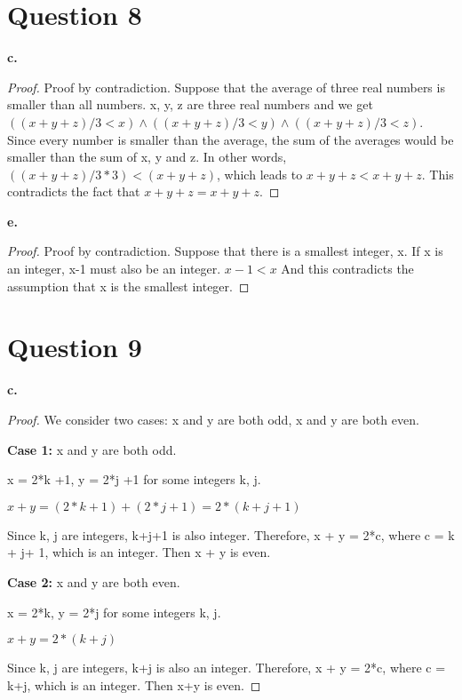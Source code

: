 \documentclass[11pt]{article}
\begin{document}
	\newpage
	\section*{Question 8}
	\textbf{c.}
	\begin{proof}
	Proof by contradiction. Suppose that the average of three real numbers is smaller than all numbers. x, y, z are three real numbers and we get $((x+y+z)/3<x)\wedge ((x+y+z)/3<y)\wedge ((x+y+z)/3<z)$. Since every number is smaller than the average, the sum of the averages would be smaller than the sum of x, y and z. In other words, $((x+y+z)/3*3)<(x+y+z)$, which leads to $x+y+z<x+y+z$. This contradicts the fact that $x+y+z=x+y+z$.
    \end{proof}

	\vspace{2mm}
	\textbf{e.}
	\begin{proof}
	Proof by contradiction. Suppose that there is a smallest integer, x. If x is an integer, x-1 must also be an integer. $x-1<x$ And this contradicts the assumption that x is the smallest integer. 
	\end{proof}
	
	\newpage
	\section*{Question 9}
	\textbf{c.}
	\begin{proof}
	We consider two cases: x and y are both odd, x and y are both even.
	
	\textbf{Case 1: } x and y are both odd.
	
	x = 2*k +1, y = 2*j +1 for some integers k, j.
	
	$x+y=(2*k+1)+(2*j+1)=2*(k+j+1)$
	
	Since k, j are integers, k+j+1 is also integer. Therefore, x + y = 2*c, where c = k + j+ 1, which is an integer. Then x + y is even.
	
	\textbf{Case 2: } x and y are both even.
	
	x = 2*k, y = 2*j for some integers k, j.
	
	$x+y=2*(k+j)$
	
	Since k, j are integers, k+j is also an integer. Therefore, x + y = 2*c, where c = k+j, which is an integer. Then x+y is even.
	
	\end{proof}
	
\end{document}

